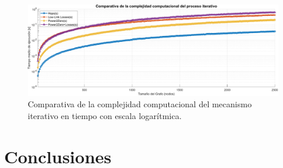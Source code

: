 \begin{figure}[ht!]
    \centering
    \includegraphics[width=\textwidth]{fig/07_bloste/bloste_26.pdf}
    \caption{Comparativa de la complejidad computacional del mecanismo iterativo en tiempo con escala logarítmica.}
    \label{fig:iterative_complexity_double_average}
\end{figure}

\section{Conclusiones}

